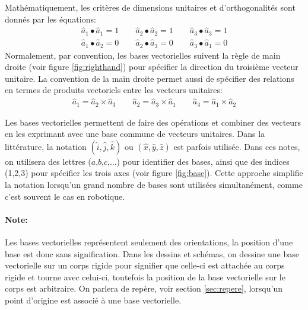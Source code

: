 Mathématiquement, les critères de dimensions unitaires et d'orthogonalités sont donnés par les équations:
\begin{align}
\hat{a}_{1} \bullet \hat{a}_{1} = 1 \quad\quad \hat{a}_{2} \bullet \hat{a}_{2} = 1 \quad\quad \hat{a}_{3} \bullet \hat{a}_{3} = 1 
\label{eq:unit} \\
\hat{a}_{1} \bullet \hat{a}_{2} = 0 \quad\quad \hat{a}_{2} \bullet \hat{a}_{3} = 0 \quad\quad \hat{a}_{3} \bullet \hat{a}_{1} = 0
\label{eq:ortho}
\end{align} 
Normalement, par convention, les bases vectorielles suivent la règle de main droite (voir figure \ref{fig:righthand}) pour spécifier la direction du troisième vecteur unitaire. La convention de la main droite permet aussi de spécifier des relations en termes de produits vectoriels entre les vecteurs unitaires:
\begin{align}
\hat{a}_{1} = \hat{a}_{2} \times \hat{a}_{3} \quad\quad \hat{a}_{2} = \hat{a}_{3} \times \hat{a}_{1} \quad\quad \hat{a}_{3} = \hat{a}_{1} \times \hat{a}_{2} 
\label{eq:righthand}
\end{align} 

Les bases vectorielles permettent de faire des opérations et combiner des vecteurs en les exprimant avec une base commune de vecteurs unitaires. Dans la littérature, la notation $(\hat{i},\hat{j},\hat{k})$ ou $(\hat{x},\hat{y},\hat{z})$ est parfois utilisée. Dans ces notes, on utilisera des lettres ($a$,$b$,$c$,...) pour identifier des bases, ainsi que des indices (1,2,3) pour spécifier les trois axes (voir figure \ref{fig:base}). Cette approche simplifie la notation lorsqu'un grand nombre de bases sont utilisées simultanément, comme c'est souvent le cas en robotique.

\paragraph{Note:} Les bases vectorielles représentent seulement des orientations, la position d'une base est donc sans signification. Dans les dessins et schémas, on dessine une base vectorielle sur un corps rigide pour signifier que celle-ci est attachée au corps rigide et tourne avec celui-ci, toutefois la position de la base vectorielle sur le corps est arbitraire. On parlera de repère, voir section \ref{sec:repere}, lorsqu'un point d'origine est associé à une base vectorielle. 




